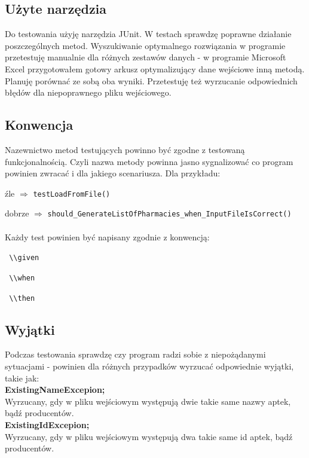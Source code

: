\documentclass[]{article}
\begin{document}
    \subsection{Użyte narzędzia}
    Do testowania użyję narzędzia JUnit. W testach sprawdzę poprawne działanie poszczególnych metod. Wyszukiwanie optymalnego rozwiązania w programie przetestuję manualnie dla różnych zestawów danych - w programie Microsoft Excel przygotowałem gotowy arkusz optymalizujący dane wejściowe inną metodą. Planuję porównać ze sobą oba wyniki. Przetestuję też wyrzucanie odpowiednich błędów dla niepoprawnego pliku wejściowego.

    \subsection{Konwencja}
    Nazewnictwo metod testujących powinno być zgodne z testowaną funkcjonalnością. Czyli nazwa metody powinna jasno sygnalizować co program powinien zwracać i dla jakiego scenariusza. Dla przykładu:

    źle $ \Rightarrow $ \verb|testLoadFromFile()|

    dobrze $ \Rightarrow $ \verb|should_GenerateListOfPharmacies_when_InputFileIsCorrect()|\\\\
    Każdy test powinien być napisany zgodnie z konwencją:

    \verb| \\given|

    \verb| \\when|

    \verb| \\then|

    \subsection{Wyjątki}
    Podczas testowania sprawdzę czy program radzi sobie z niepożądanymi sytuacjami - powinien dla różnych przypadków wyrzucać odpowiednie wyjątki, takie jak:\\

    \textbf{ ExistingNameExcepion;}\\
    Wyrzucany, gdy w pliku wejściowym występują dwie takie same nazwy aptek, bądź producentów.\\

    \textbf{ ExistingIdExcepion;}\\
    Wyrzucany, gdy w pliku wejściowym występują dwa takie same id aptek, bądź producentów.\\
\end{document}
